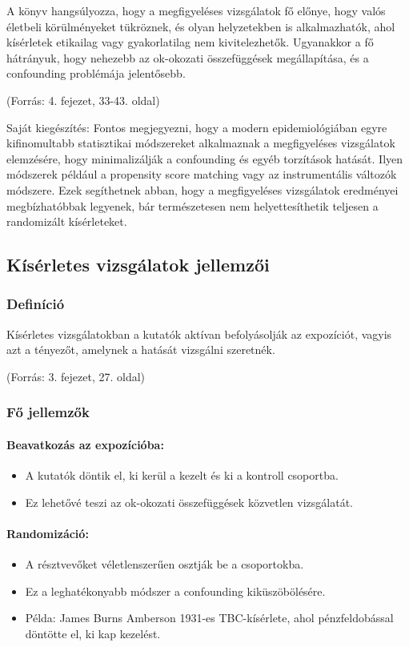 \documentclass[a4paper,12pt]{article}
\begin{document}
A könyv hangsúlyozza, hogy a megfigyeléses vizsgálatok fő előnye, hogy valós életbeli körülményeket tükröznek, és olyan helyzetekben is alkalmazhatók, ahol kísérletek etikailag vagy gyakorlatilag nem kivitelezhetők. Ugyanakkor a fő hátrányuk, hogy nehezebb az ok-okozati összefüggések megállapítása, és a confounding problémája jelentősebb.

(Forrás: 4. fejezet, 33-43. oldal)

Saját kiegészítés: Fontos megjegyezni, hogy a modern epidemiológiában egyre kifinomultabb statisztikai módszereket alkalmaznak a megfigyeléses vizsgálatok elemzésére, hogy minimalizálják a confounding és egyéb torzítások hatását. Ilyen módszerek például a propensity score matching vagy az instrumentális változók módszere. Ezek segíthetnek abban, hogy a megfigyeléses vizsgálatok eredményei megbízhatóbbak legyenek, bár természetesen nem helyettesíthetik teljesen a randomizált kísérleteket.

\subsection{Kísérletes vizsgálatok jellemzői}

\subsubsection{Definíció}
Kísérletes vizsgálatokban a kutatók aktívan befolyásolják az expozíciót, vagyis azt a tényezőt, amelynek a hatását vizsgálni szeretnék.

(Forrás: 3. fejezet, 27. oldal)

\subsubsection{Fő jellemzők}

\paragraph{Beavatkozás az expozícióba:}
\begin{itemize}
    \item A kutatók döntik el, ki kerül a kezelt és ki a kontroll csoportba.
    \item Ez lehetővé teszi az ok-okozati összefüggések közvetlen vizsgálatát.
\end{itemize}

\paragraph{Randomizáció:}
\begin{itemize}
    \item A résztvevőket véletlenszerűen osztják be a csoportokba.
    \item Ez a leghatékonyabb módszer a confounding kiküszöbölésére.
    \item Példa: James Burns Amberson 1931-es TBC-kísérlete, ahol pénzfeldobással döntötte el, ki kap kezelést.
\end{itemize}
\end{document}
